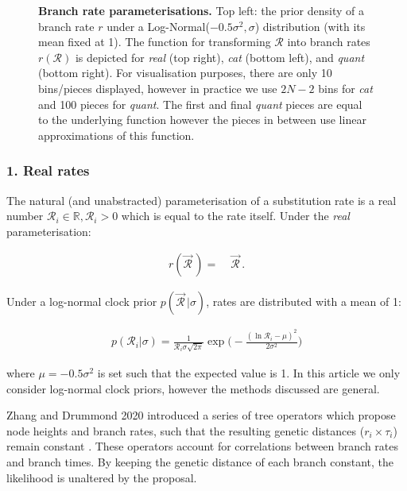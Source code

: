 \documentclass[10pt,letterpaper]{article}
\begin{document}
\begin{figure}[!h]
\caption{\textbf{Branch rate parameterisations.} Top left: the prior density of a branch rate $r$ under a Log-Normal($-0.5\sigma^2, \sigma$) distribution (with its mean fixed at 1). 
The function for transforming $\mathcal{R}$ into branch rates $r(\mathcal{R})$ is depicted for \textit{real} (top right), \textit{cat} (bottom left), and \textit{quant} (bottom right).
For visualisation purposes, there are only 10 bins/pieces displayed, however in practice we use $2N-2$ bins for \textit{cat} and 100 pieces for \textit{quant}.
The first and final \textit{quant} pieces are equal to the underlying function however the pieces in between use linear approximations of this function. }
\label{fig:rateparams}
\end{figure}



\clearpage
\subsubsection*{1. Real rates}
The natural (and unabstracted) parameterisation of a substitution rate is a real number $\mathcal{R}_i \in \mathbb{R}, \mathcal{R}_i > 0$ which is equal to the rate itself. 
Under the \textit{real} parameterisation:

\begin{align}
r(\vec{\mathcal{R}}^{\,}) =& \; \vec{\mathcal{R}}^{\,}.
\end{align}


Under a log-normal clock prior $p(\vec{\mathcal{R}}^{\,} | \sigma)$, rates are distributed with a mean of 1:

\begin{align}
p(\mathcal{R}_i | \sigma) = \frac{1}{\mathcal{R}_i \sigma \sqrt{2\pi}} \exp \big( -\frac{(\ln \mathcal{R}_i - \mu)^2}{2\sigma^2} \big) 
\end{align}


\noindent
where $\mu = -0.5\sigma^2$ is set such that the expected value is 1.
In this article we only consider log-normal clock priors, however the methods discussed are general.


Zhang and Drummond 2020 introduced a series of tree operators which propose node heights and branch rates, such that the resulting genetic distances ($r_i \times \tau_i$) remain constant \cite{zhang2020improving}. 
These operators account for correlations between branch rates and branch times.
By keeping the genetic distance of each branch constant, the likelihood is unaltered by the proposal. 
\end{document}
